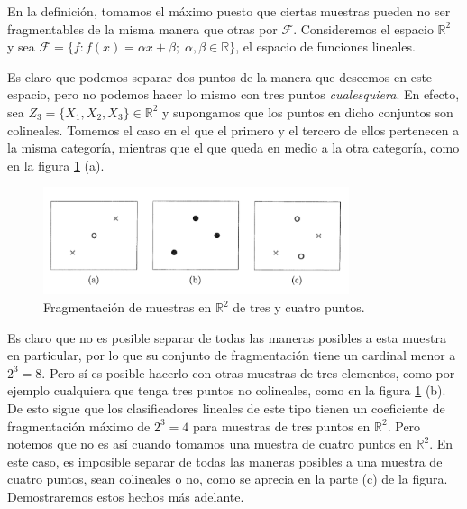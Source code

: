 \documentclass{report}
\begin{document}
En la definición, tomamos el máximo puesto que ciertas muestras pueden no ser fragmentables de la misma manera que otras por \(\mathcal{F}\). 
Consideremos el espacio $\mathbb{R}^2$ y sea $\mathcal{F}=\{f: f(x)= \alpha x + \beta; \; \alpha, \beta\in\mathbb{R}\}$, el espacio
de funciones lineales.\newline

Es claro que podemos separar dos puntos de la manera que deseemos en este espacio, pero no podemos hacer lo mismo con tres puntos \textit{cualesquiera}.
En efecto, sea $Z_3 = \{X_1,X_2,X_3\} \in \mathbb{R}^2$ y supongamos que los puntos en dicho conjuntos son colineales. Tomemos el caso en el que el primero y el tercero de ellos pertenecen a la misma categoría,
mientras que el que queda en medio a la otra categoría, como en la figura \ref{fragmentacion perceptron} (a).\newline 

\begin{figure}[ht]
    \centering
    \includegraphics[width=0.8\textwidth]{Images/5.png}
    
    \caption{Fragmentación de muestras en $\mathbb{R}^2$ de tres y cuatro puntos.}
    \label{fragmentacion perceptron}
    \end{figure}

Es claro que no es posible separar de todas las maneras posibles a esta muestra en particular, por lo que su conjunto de fragmentación
tiene un cardinal menor a $2^3=8$. Pero sí es posible hacerlo con otras muestras de tres elementos, como por ejemplo cualquiera que tenga 
tres puntos no colineales, como en la figura \ref{fragmentacion perceptron} (b). De esto sigue
que los clasificadores lineales de este tipo tienen un coeficiente de fragmentación máximo de $2^3=4$ para muestras de tres puntos en $\mathbb{R}^2$.
Pero notemos que no es así cuando tomamos una muestra de cuatro puntos en $\mathbb{R}^2$. En este caso, es imposible separar de todas las maneras posibles
a una muestra de cuatro puntos, sean colineales o no, como se aprecia en la parte (c) de la figura. Demostraremos estos hechos más adelante.\newline
\end{document}
